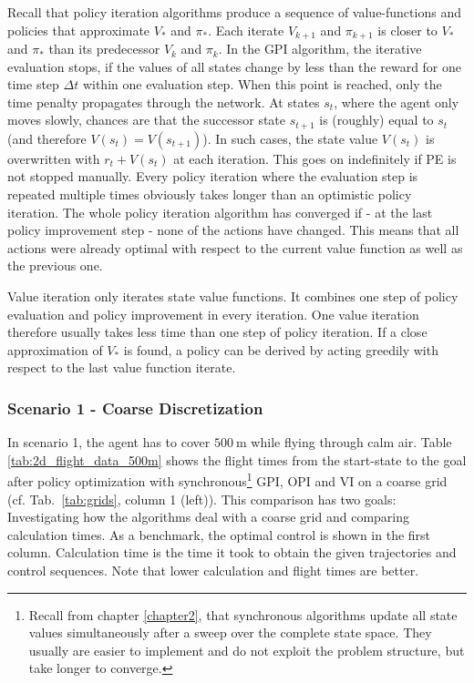 Recall that policy iteration algorithms produce a sequence of value-functions and policies that approximate $V_*$ and $\pi_*$. Each iterate $V_{k+1}$ and $\pi_{k+1}$ is closer to $V_*$ and $\pi_*$ than its predecessor $V_k$ and $\pi_k$.
In the GPI algorithm, the iterative evaluation stops, if the values of all states change by less than the reward for one time step $\Delta t$ within one evaluation step. When this point is reached, only the time penalty propagates through the network. At states $s_t$, where the agent only moves slowly, chances are that the successor state $s_{t+1}$ is (roughly) equal to $s_t$ (and therefore $V(s_t)=V(s_{t+1})$). In such cases, the state value $V(s_t)$ is overwritten with $r_t + V(s_t)$ at each iteration. This goes on indefinitely if PE is not stopped manually. Every policy iteration where the evaluation step is repeated multiple times obviously takes longer than an optimistic policy iteration. The whole policy iteration algorithm has converged if - at the last policy improvement step - none of the actions have changed. This means that all actions were already optimal with respect to the current value function as well as the previous one. \smallbreak

Value iteration only iterates state value functions. It combines one step of policy evaluation and policy improvement in every iteration. One value iteration therefore usually takes less time than one step of policy iteration. If a close approximation of $V_*$ is found, a policy can be derived by acting greedily with respect to the last value function iterate.

\subsubsection{Scenario 1 - Coarse Discretization}

In scenario 1, the agent has to cover $500~\text{m}$ while flying through calm air. Table \ref{tab:2d_flight_data_500m} shows the flight times from the start-state to the goal after policy optimization with synchronous\footnote{Recall from chapter \ref{chapter2}, that synchronous algorithms update all state values simultaneously after a sweep over the complete state space. They usually are easier to implement and do not exploit the problem structure, but take longer to converge.} GPI, OPI and VI on a coarse grid (cf. Tab.~\ref{tab:grids}, column 1 (left)). This comparison has two goals: Investigating how the algorithms deal with a coarse grid and comparing calculation times. As a benchmark, the optimal control  is shown in the first column. Calculation time is the time it took to obtain the given trajectories and control sequences. Note that lower calculation and flight times are better.

